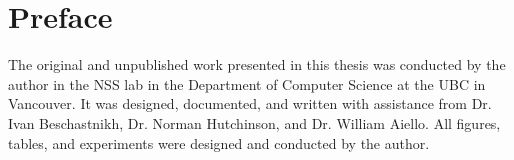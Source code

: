 
\chapter{Preface} 

The original and unpublished work presented in this thesis was conducted by the author in the \ac{NSS} lab in the Department of Computer Science at the \ac{UBC} in Vancouver. It was designed, documented, and written with assistance from Dr. Ivan Beschastnikh, Dr. Norman Hutchinson, and Dr. William Aiello. All figures, tables, and experiments were designed and conducted by the author.

